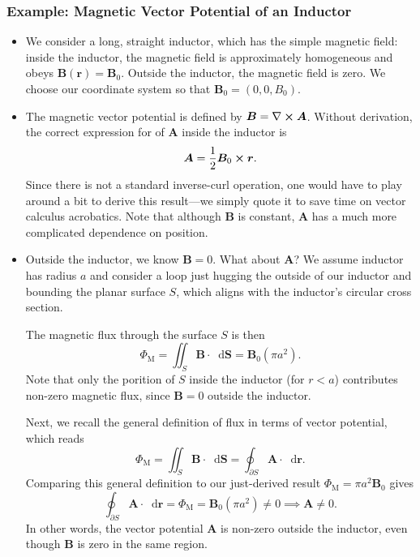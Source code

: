 \documentclass[11pt, a4paper]{article}
\newcommand{\diff}{\mathop{}\!\mathrm{d}} %
\renewcommand{\vec}[1]{\bm{#1}} %
\renewcommand{\r}{\vec{r}}
\newcommand{\B}{\vec{B}} %
\newcommand{\A}{\vec{A}} %
\renewcommand{\curl}{\nabla \cross}
\begin{document}
\subsubsection{Example: Magnetic Vector Potential of an Inductor}
\begin{itemize}
    \item We consider a long, straight inductor, which has the simple magnetic field: inside the inductor, the magnetic field is approximately homogeneous and obeys $ \B(\r) = \B_{0} $. Outside the inductor, the magnetic field is zero. We choose our coordinate system so that $ \B_{0} = (0, 0, B_{0}) $. 
	
	\item The magnetic vector potential is defined by $ \B = \curl \A $. Without derivation, the correct expression for of $ \A $ inside the inductor is 
	\begin{equation*}
		\A = \frac{1}{2}\B_{0} \cross \r.
	\end{equation*}
	Since there is not a standard inverse-curl operation, one would have to play around a bit to derive this result---we simply quote it to save time on vector calculus acrobatics. Note that although $ \B $ is constant, $ \A $ has a much more complicated dependence on position.
	
	\item Outside the inductor, we know $ \B = 0 $. What about $ \A $? We assume inductor has radius $ a $ and consider a loop just hugging the outside of our inductor and bounding the planar surface $ S $, which aligns with the inductor's circular cross section.
	
	The magnetic flux through the surface $ S $ is then
	\begin{equation*}
		\Phi_{\text{M}} = \iint_{S} \B \cdot \diff \vec{S} = \B_{0} (\pi a^{2}).
	\end{equation*}
    Note that only the porition of $ S $ inside the inductor (for $ r < a $) contributes non-zero magnetic flux, since $ \B = 0 $ outside the inductor.
	
	Next, we recall the general definition of flux in terms of vector potential, which reads
	\begin{equation*}
		\Phi_{\text{M}} = \iint_{S} \B \cdot \diff \vec{S} = \oint_{\partial S} \A \cdot \diff \r.
	\end{equation*}
    Comparing this general definition to our just-derived result $ \Phi_{\text{M}} = \pi a^{2}\B_{0} $ gives
	\begin{equation*}
		\oint_{\partial S} \A \cdot \diff \r = \Phi_{\text{M}} = \B_{0} (\pi a^{2}) \neq 0  \implies \A \neq 0.
	\end{equation*}
    In other words, the vector potential $ \A $ is non-zero outside the inductor, even though $ \B $ is zero in the same region.
	

\end{itemize}
\end{document}
